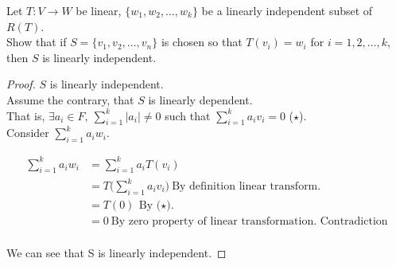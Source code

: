 \documentclass[12pt]{article}
\newenvironment{exercise}[2][Exercise]{\begin{trivlist}
\item[\hskip \labelsep{\bfseries #1}\hskip \labelsep{\bfseries #2.}]}{\end{trivlist}}
\begin{document}
\begin{exercise}{2.1.13} Let $T: V \rightarrow W$ be linear, $\{w_1, w_2, \dots, w_k\}$ be a linearly independent subset of $R(T)$. \\
    Show that if $S = \{v_1, v_2, \dots, v_n\}$ is chosen so that $T(v_i) = w_i$ for $i = 1,2,\dots,k$, then $S$ is linearly independent.

    \begin{proof} $S$ is linearly independent. \\

        \noindent Assume the contrary, that $S$ is linearly dependent. \\
        That is, $\exists a_i \in F,\ \sum_{i=1}^{k} |a_i| \neq 0$ such that $\sum_{i=1}^{k} a_i v_i = 0$ ($\star$). \\
        Consider $\sum_{i=1}^{k} a_i w_i$.

        \begin{align*}
            \sum_{i=1}^{k} a_i w_i
            & = \sum_{i=1}^{k} a_i T(v_i) \\
            & = T\big(\sum_{i=1}^{k} a_i v_i\big)\ \text{By definition linear transform.} \\
            & = T(0)\ \text{By ($\star$).} \\
            & = 0\ \text{By zero property of linear transformation. Contradiction} \\
        \end{align*}
        
        We can see that S is linearly independent.

    \end{proof}

\end{exercise}
\end{document}
